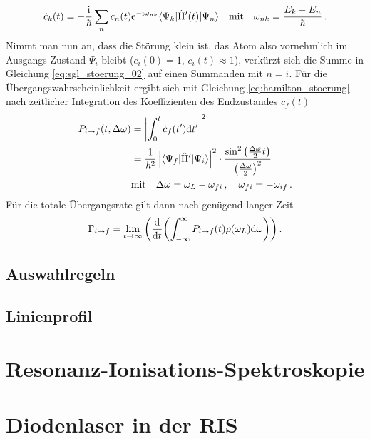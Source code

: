 \begin{equation}\label{eq:sgl_stoerung_02}
	\dot
	c_k(t)=-\frac{\mathrm{i}}{\hbar}\sum_n{c_n(t)\mathrm{e}^{-\mathrm{i}\omega_{nk}}\langle{\Psi_k}|\hat{\mathrm{H}}'(t)|{\Psi_n}\rangle}
	\quad\text{mit}\quad
	\omega_{nk}=\frac{E_k-E_n}{\hbar}\,.
\end{equation}
Nimmt man nun an, dass die Störung klein ist, das Atom also vornehmlich im
Ausgangs-Zustand $\Psi_i$ bleibt ($c_i(0)=1$, $c_i(t)\approx 1$), verkürzt
sich die Summe in Gleichung \ref{eq:sgl_stoerung_02} auf einen Summanden mit $n=i$.
Für die Übergangswahrscheinlichkeit ergibt sich mit Gleichung \ref{eq:hamilton_stoerung} nach
zeitlicher Integration des Koeffizienten des Endzustandes $\dot c_f(t)$
\begin{eqnarray}\label{eq:uebergangs_wkt}
	\begin{split}
		P_{i\to f}(t,\Delta\omega) &= \left|\int_0^t{\dot c_f(t')\mathrm{d} t'}\right|^2\\
		& =
		\frac{1}{\hbar^2}\left|\langle{\Psi_f}|\hat{\mathrm{H}}'|{\Psi_i}\rangle\right|^2\cdot\frac{\sin^2{\left(\frac{\Delta\omega}{2}t\right)}}{\left(\frac{\Delta\omega}{2}\right)^2}\\
		&\text{mit}\quad\Delta\omega=\omega_L-\omega_{fi}\,,\quad\omega_{fi}=-\omega_{if}\,.
	\end{split}
\end{eqnarray}
Für die totale Übergangsrate gilt dann nach genügend langer Zeit
\begin{equation}\label{eq:uebergangs_rate}
	\Gamma_{i\to f} =
	\lim_{t\to\infty}{\left(\frac{\mathrm{d} }{\mathrm{d} t}{\left(\int_{-\infty}^{\infty}{P_{i\to
	f}(t)\rho(\omega_L)}\mathrm{d}\omega\right)}\right)}\,.
\end{equation}


\subsection{Auswahlregeln}\label{subsec:auswahlregeln}


\subsection{Linienprofil}\label{sec:linienprofil}

\section{Resonanz-Ionisations-Spektroskopie}\label{sec:ris}

\section{Diodenlaser in der RIS}\label{sec:diodenlaser}
